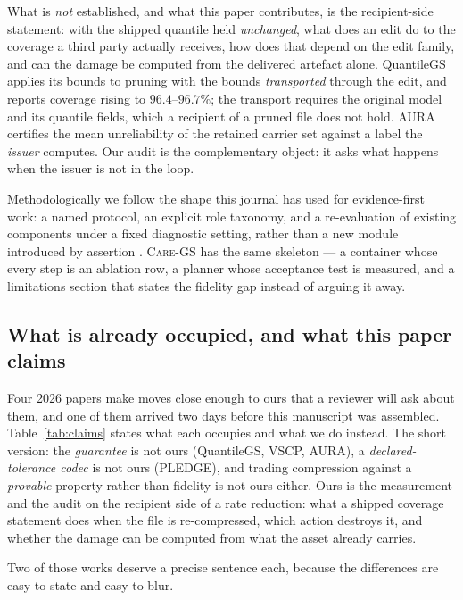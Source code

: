 \documentclass[preprint,number,3p]{elsarticle}
\newcommand{\care}{\textsc{Care-GS}}
\begin{document}
What is \emph{not} established, and what this paper contributes, is the recipient-side statement: with the shipped
quantile held \emph{unchanged}, what does an edit do to the coverage a third party actually receives, how does that
depend on the edit family, and can the damage be computed from the delivered artefact alone. QuantileGS applies its
bounds to pruning with the bounds \emph{transported} through the edit, and reports coverage rising to
$96.4$--$96.7\%$; the transport requires the original model and its quantile fields, which a recipient of a pruned
file does not hold. AURA certifies the mean unreliability of the retained carrier set against a label the
\emph{issuer} computes. Our audit is the complementary object: it asks what happens when the issuer is not in the
loop.

Methodologically we follow the shape this journal has used for evidence-first work: a named protocol, an explicit
role taxonomy, and a re-evaluation of existing components under a fixed diagnostic setting, rather than a new module
introduced by assertion \cite{jvcir-infoprotocol}. \care{} has the same skeleton --- a container whose every step is
an ablation row, a planner whose acceptance test is measured, and a limitations section that states the fidelity gap
instead of arguing it away.

\subsection{What is already occupied, and what this paper claims}
\label{sec:claim-boundaries}

Four 2026 papers make moves close enough to ours that a reviewer will ask about them, and one of them arrived two days
before this manuscript was assembled. Table~\ref{tab:claims} states what each occupies and what we do instead. The
short version: the \emph{guarantee} is not ours (QuantileGS, VSCP, AURA), a \emph{declared-tolerance codec} is not ours
(PLEDGE), and trading compression against a \emph{provable} property rather than fidelity is not ours either. Ours is
the measurement and the audit on the recipient side of a rate reduction: what a shipped coverage statement does when
the file is re-compressed, which action destroys it, and whether the damage can be computed from what the asset
already carries.

Two of those works deserve a precise sentence each, because the differences are easy to state and easy to blur.
\end{document}

